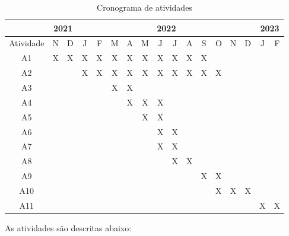 \documentclass[12pt, a4paper, english, brazil]{article}
\begin{document}
\begin{table}[ht]
\centering
\caption{Cronograma de atividades}
\label{tab:cronograma}
\begin{tabular}{|c|c|c|c|c|c|c|c|c|c|c|c|c|c|c|c|c|}
\hline
          & \multicolumn{2}{c|}{2021} & \multicolumn{12}{c|}{2022}                    & \multicolumn{2}{c|}{2023} \\ \hline
Atividade & N           & D           & J & F & M & A & M & J & J & A & S & O & N & D & J           & F           \\ \hline
A1        & X           & X           & X & X & X & X & X & X & X & X & X &   &   &   &             &             \\ \hline
A2        &             &             & X & X & X & X & X & X & X & X & X & X &   &   &             &             \\ \hline
A3        &             &             &   &   & X & X &   &   &   &   &   &   &   &   &             &             \\ \hline
A4        &             &             &   &   &   & X & X & X &   &   &   &   &   &   &             &             \\ \hline
A5        &             &             &   &   &   &   & X & X &   &   &   &   &   &   &             &             \\ \hline
A6        &             &             &   &   &   &   &   & X & X &   &   &   &   &   &             &             \\ \hline
A7        &             &             &   &   &   &   &   & X & X &   &   &   &   &   &             &             \\ \hline
A8        &             &             &   &   &   &   &   &   & X & X &   &   &   &   &             &             \\ \hline
A9        &             &             &   &   &   &   &   &   &   &   & X & X &   &   &             &             \\ \hline
A10       &             &             &   &   &   &   &   &   &   &   &   & X & X & X &             &             \\ \hline
A11       &             &             &   &   &   &   &   &   &   &   &   &   &   &   & X           & X           \\ \hline
\end{tabular}
\end{table}

As atividades são descritas abaixo:
\end{document}
